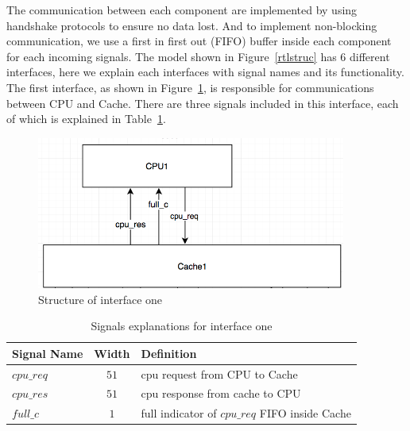 \documentclass[12pt,frontmatter,copyright,thesis]{usfmanus}
\begin{document}
The communication between each component are implemented by using handshake protocols to ensure no
data lost. And to implement non-blocking communication, we use
a first in first out (FIFO) buffer inside each component for each incoming signals.
The model shown in Figure~\ref{rtlstruc} has 6 different interfaces, here we explain each interfaces
with signal names and its functionality.
The first interface, as shown in Figure~\ref{int1}, is responsible for communications between CPU and Cache.
There are three signals included in this interface, each of which is explained in Table~\ref{int1t}.
\begin{figure}[h]
\centering
    \includegraphics[width=4in]{int1.png}
    \caption{Structure of interface one}
    \label{int1}
 \end{figure}

\begin{table}[h]
\caption{Signals explanations for interface one}

\begin{tabular}{|l|c | p{12cm} |}
\hline
Signal Name & Width & Definition \\
\hline
\hline
$cpu\_req$ 		&$51$			& cpu request from CPU to Cache \\
\hline
$cpu\_res$ 		&$51$			& cpu response from cache to CPU \\
\hline
$full\_c$ 			&$1$				& full indicator of $cpu\_req$ FIFO inside Cache\\
\hline
\end{tabular}
\label{int1t}
\end{table}
\end{document}
